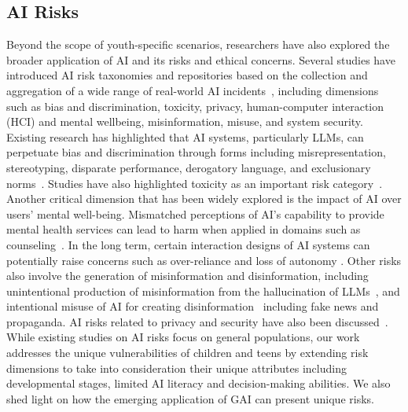 \subsection{AI Risks}
\vspace{-3pt}
Beyond the scope of youth-specific scenarios, researchers have also explored the broader application of AI and its risks and ethical concerns. 
Several studies have introduced AI risk taxonomies and repositories based on the collection and aggregation of a wide range of real-world AI incidents~\cite{slattery2024ai,critch2023tasra,AVIDDatabasea,AIAAIC,zeng2024ai,wang2023decodingtrust}, including dimensions such as bias and discrimination, toxicity, privacy, human-computer interaction (HCI) and mental wellbeing, misinformation, misuse, and system security.
Existing research has highlighted that AI systems, particularly LLMs, can perpetuate bias and discrimination through forms including misrepresentation, stereotyping, disparate performance, derogatory language, and exclusionary norms~\cite{Roselli2019ManagingBI, ferrer2021bias, abid2021persistent, gallegos2024bias}.
Studies have also highlighted toxicity as an important risk category~\cite{Gehman2020RealToxicityPromptsEN, gallegos2024bias}. 
Another critical dimension that has been widely explored is the impact of AI over users' mental well-being. Mismatched perceptions of AI's capability to provide mental health services can lead to harm when applied in domains such as counseling~\cite{lawrence2024opportunities}. 
In the long term, certain interaction designs of AI systems can potentially raise concerns such as over-reliance \cite{zeng2024ai,weidinger2021ethical} and loss of autonomy \cite{slattery2024ai}. 
Other risks also involve the generation of misinformation and disinformation, including unintentional production of misinformation from the hallucination of LLMs~\cite{chen2023can}, and intentional misuse of AI for creating disinformation~\cite{bontridder2021role} including fake news and propaganda.
AI risks related to privacy and security have also been discussed~\cite{lee2024deepfakes}.
While existing studies on AI risks focus on general populations, our work addresses the unique vulnerabilities of children and teens by extending risk dimensions to take into consideration their unique attributes including developmental stages, limited AI literacy and decision-making abilities. We also shed light on how the emerging application of GAI can present unique risks.


